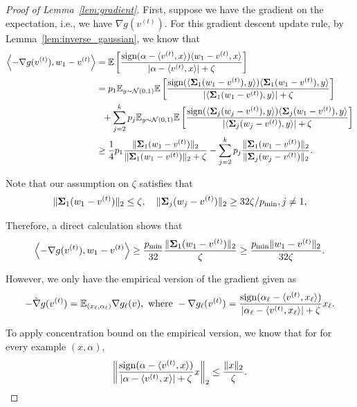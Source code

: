 \begin{proof}[Proof of Lemma~\ref{lem:gradient}]
First, suppose we have the gradient on the expectation, i.e., we have $\nabla g(v^{(t)})$. For this gradient descent update rule,
by Lemma~\ref{lem:inverse_gaussian}, we know that 
\begin{align*}
 \left\langle - \nabla g(v^{(t)}), w_1 - v^{(t)} \right\rangle 
  & = \mathbb{E} \left[\frac{\operatorname*{sign}(\alpha - \langle v^{(t)}, x \rangle) \langle w_1 - v^{(t)}, x \rangle}{|\alpha - \langle v^{(t)}, x \rangle| + \zeta}  \right] 
	\\
	& = p_1 \mathbb{E}_{y \sim \mathcal{N}(0, 1)} \mathbb{E} \left[\frac{\operatorname*{sign}(\langle \bold{\Sigma}_1 (w_1 - v^{(t)}), y \rangle) \langle \bold{\Sigma}_1 (w_1 - v^{(t)}), y \rangle}{|\langle \bold{\Sigma}_1(w_1 - v^{(t)}), y \rangle| + \zeta}  \right]
  \\
  & ~~ + \sum_{j = 2}^k p_j \mathbb{E}_{y \sim \mathcal{N}(0, 1)} \mathbb{E} \left[\frac{\operatorname*{sign}(\langle \bold{\Sigma}_j (w_j - v^{(t)}), y \rangle) \langle \bold{\Sigma}_j (w_1 - v^{(t)}), y \rangle}{|\langle \bold{\Sigma}_j(w_j - v^{(t)}), y \rangle| + \zeta}  \right]
  \\
  & \geq \frac{1}{4} p_1 \frac{\| \bold{\Sigma}_1 (w_1 - v^{(t)})\|_2 }{\|\bold{\Sigma}_1 (w_1 - v^{(t)}) \|_2+ \zeta} - \sum_{j = 2}^k p_j \frac{\|\bold{\Sigma}_1 (w_1 - v^{(t)}) \|_2} {\| \bold{\Sigma}_j (w_j - v^{(t)})\|_2 }.
\end{align*}

Note that our assumption on $\zeta$ satisfies that
\begin{align} \label{eqn:grad_condition}
  \|\bold{\Sigma}_1 (w_1 - v^{(t)}) \|_2 \leq \zeta, \quad \|\bold{\Sigma}_j (w_j - v^{(t)}) \|_2 \geq 32 \zeta / p_{\min}, j\neq 1,
\end{align}

Therefore, a direct calculation shows that 
$$
  \left\langle -\nabla g(v^{(t)}), w_1 - v^{(t)} \right\rangle 
	\geq \frac{p_{\min}}{32 } \frac{\|\bold{\Sigma}_1 (w_1 - v^{(t)}) \|_2}{\zeta} 
	\geq   \frac{p_{\min} \| w_1 - v^{(t)} \|_2}{32 \zeta}.
$$

However, we only have the empirical version of the gradient given as
$$
 -\tilde\nabla g(v^{(t)}) = \mathbb{E}_{(x_\ell,\alpha_\ell)} \nabla g_\ell(v), \mbox{~where~} -\nabla g_\ell(v^{(t)}) = \frac{\operatorname*{sign}(\alpha_\ell - \langle v^{(t)}, x_\ell \rangle)}{|\alpha_\ell - \langle v^{(t)}, x_\ell \rangle| + \zeta} x_\ell.
$$

To apply concentration bound on the empirical version, we know that for for every example $(x,\alpha)$, 
$$
  \left\|\frac{\operatorname*{sign}(\alpha - \langle  v^{(t)}, x \rangle)}{|\alpha - \langle v^{(t)}, x \rangle| + \zeta} x  \right\|_2 \leq \frac{\|x\|_2}{\zeta}. 
$$


\end{proof}

